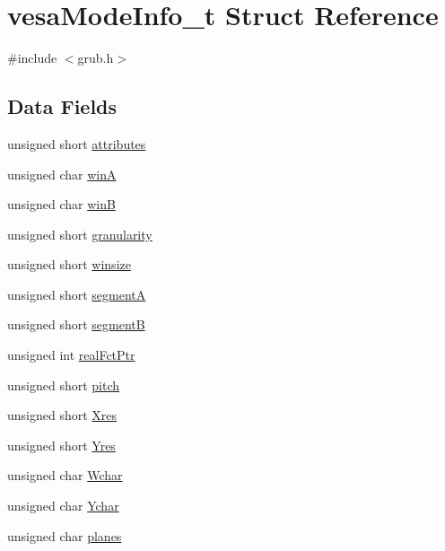 \hypertarget{structvesaModeInfo__t}{\section{vesa\+Mode\+Info\+\_\+t Struct Reference}
\label{structvesaModeInfo__t}
}


{\ttfamily \#include $<$grub.\+h$>$}

\subsection*{Data Fields}
\begin{DoxyCompactItemize}
\item 
unsigned short \hyperlink{structvesaModeInfo__t_a339145bcfb50fc81609813734415d4db}{attributes}
\item 
unsigned char \hyperlink{structvesaModeInfo__t_ac056f64b4375a72439ae6e84aae88e7f}{win\+A}
\item 
unsigned char \hyperlink{structvesaModeInfo__t_a386d2bc2570ec21a98664958429247ed}{win\+B}
\item 
unsigned short \hyperlink{structvesaModeInfo__t_a59708e15ac9929ad9218b4ef25f4e861}{granularity}
\item 
unsigned short \hyperlink{structvesaModeInfo__t_a215d7dc86f8c13909156dbff6518d0c8}{winsize}
\item 
unsigned short \hyperlink{structvesaModeInfo__t_af83d59348e11c50399f088cea83fb0a9}{segment\+A}
\item 
unsigned short \hyperlink{structvesaModeInfo__t_a3f8f6fe3c4ee7fdbca2cf15883db343f}{segment\+B}
\item 
unsigned int \hyperlink{structvesaModeInfo__t_a3c3c1fa91bfb8ec58a80ff0b9c1deaae}{real\+Fct\+Ptr}
\item 
unsigned short \hyperlink{structvesaModeInfo__t_aed2e5dc0be6bd66efb67ab3de2191bfe}{pitch}
\item 
unsigned short \hyperlink{structvesaModeInfo__t_a5ed5fe4414e2a46fa3670733486905ae}{Xres}
\item 
unsigned short \hyperlink{structvesaModeInfo__t_a54003f0083b0581fc14babfec48a1d7d}{Yres}
\item 
unsigned char \hyperlink{structvesaModeInfo__t_a154546a781d9a7d5da7cc0b77a7b998c}{Wchar}
\item 
unsigned char \hyperlink{structvesaModeInfo__t_a1c395c3097057ffd0f3d12ea9df6133d}{Ychar}
\item 
unsigned char \hyperlink{structvesaModeInfo__t_a9d1ab189d261e008a41daa04d5ee9693}{planes}

\end{DoxyCompactItemize}
